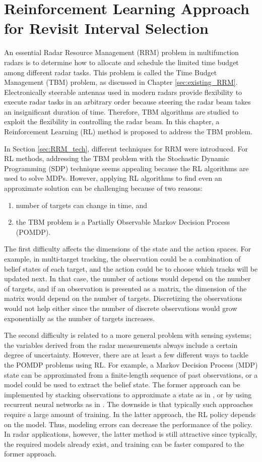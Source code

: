 \documentclass[english, 12pt, a4paper, elec, utf8, a-1b, online]{aaltothesis}
\numberwithin{equation}{section}
\begin{document}
\newpage
\section{Reinforcement Learning Approach for Revisit Interval Selection}\label{sec:rl_ri}

An essential Radar Resource Management (RRM) problem in multifunction radars is to determine how to allocate and schedule the limited time budget among different radar tasks. 
This problem is called the Time Budget Management (TBM) problem, as discussed in Chapter \ref{sec:existing_RRM}.
Electronically steerable antennas used in modern radars provide flexibility to execute radar tasks in an arbitrary order because steering the radar beam takes an insignificant duration of time. 
Therefore, TBM algorithms are studied to exploit the flexibility in controlling the radar beam.
In this chapter, a Reinforcement Learning (RL) method is proposed to address the TBM problem.

In Section \ref{sec:RRM_tech}, different techniques for RRM were introduced.
For RL methods, addressing the TBM problem with the Stochastic Dynamic Programming (SDP) technique seems appealing because the RL algorithms are used to solve MDPs.
However, applying RL algorithms to find even an approximate solution can be challenging because of two reasons:
\begin{enumerate}
    \item number of targets can change in time, and
    \item the TBM problem is a Partially Observable Markov Decision Process (POMDP).
\end{enumerate}
The first difficulty affects the dimensions of the state and the action spaces. 
For example, in multi-target tracking, the observation could be a combination of belief states of each target, and the action could be to choose which tracks will be updated next.
In that case, the number of actions would depend on the number of targets, and if an observation is presented as a matrix, the dimension of the matrix would depend on the number of targets.
Discretizing the observations would not help either since the number of discrete observations would grow exponentially as the number of targets increases.

The second difficulty is related to a more general problem with sensing systems; the variables derived from the radar measurements always include a certain degree of uncertainty.
However, there are at least a few different ways to tackle the POMDP problems using RL.
For example, a Markov Decision Process (MDP) state can be approximated from a finite-length sequence of past observations, or a model could be used to extract the belief state.
The former approach can be implemented by stacking observations to approximate a state as in \cite{Mnih2013}, or by using recurrent neural networks as in \cite{Hausknecht2015}.
The downside is that typically such approaches require a large amount of training.
In the latter approach, the RL policy depends on the model.
Thus, modeling errors can decrease the performance of the policy.
In radar applications, however, the latter method is still attractive since typically, the required models already exist, and training can be faster compared to the former approach.
\end{document}
